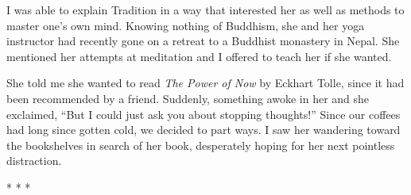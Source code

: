 I was able to explain Tradition in a way that interested her as well as methods to master one's own mind. Knowing nothing of Buddhism, she and her yoga instructor had recently gone on a retreat to a Buddhist monastery in Nepal. She mentioned her attempts at meditation and I offered to teach her if she wanted.

She told me she wanted to read \emph{The Power of Now} by Eckhart Tolle, since it had been recommended by a friend. Suddenly, something awoke in her and she exclaimed, ``But I could just ask you about stopping thoughts!'' Since our coffees had long since gotten cold, we decided to part ways. I saw her wandering toward the bookshelves in search of her book, desperately hoping for her next pointless distraction.



\begin{center}* * *\end{center}

